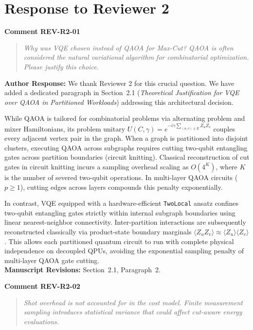 \documentclass[11pt,a4paper]{article}
\newcommand{\commentbox}[2]{
    \vspace{0.8em}
    \noindent\textbf{\textcolor{commentcolor}{#1}}
    \vspace{0.2em}
    \begin{quote}
        \small\itshape #2
    \end{quote}
}
\newcommand{\responsebox}[1]{
    \noindent\textbf{\textcolor{responsecolor}{Author Response:}} #1
    \vspace{0.8em}
}
\begin{document}
\section*{Response to Reviewer 2}

\commentbox{Comment REV-R2-01}{Why was VQE chosen instead of QAOA for Max-Cut? QAOA is often considered the natural variational algorithm for combinatorial optimization. Please justify this choice.}

\responsebox{We thank Reviewer 2 for this crucial question. We have added a dedicated paragraph in Section~2.1 (\textit{Theoretical Justification for VQE over QAOA in Partitioned Workloads}) addressing this architectural decision.

While QAOA is tailored for combinatorial problems via alternating problem and mixer Hamiltonians, its problem unitary $U(C, \gamma) = e^{-i \gamma \sum_{(u,v) \in E} Z_u Z_v}$ couples every adjacent vertex pair in the graph. When a graph is partitioned into disjoint clusters, executing QAOA across subgraphs requires cutting two-qubit entangling gates across partition boundaries (circuit knitting). Classical reconstruction of cut gates in circuit knitting incurs a sampling overhead scaling as $O(4^K)$, where $K$ is the number of severed two-qubit operations. In multi-layer QAOA circuits ($p \ge 1$), cutting edges across layers compounds this penalty exponentially.

In contrast, VQE equipped with a hardware-efficient \texttt{TwoLocal} ansatz confines two-qubit entangling gates strictly within internal subgraph boundaries using linear nearest-neighbor connectivity. Inter-partition interactions are subsequently reconstructed classically via product-state boundary marginals $\langle Z_u Z_v \rangle \approx \langle Z_u \rangle \langle Z_v \rangle$. This allows each partitioned quantum circuit to run with complete physical independence on decoupled QPUs, avoiding the exponential sampling penalty of multi-layer QAOA gate cutting.
\\[0.3em]
\textbf{Manuscript Revisions:} Section~2.1, Paragraph~2.}

\commentbox{Comment REV-R2-02}{Shot overhead is not accounted for in the cost model. Finite measurement sampling introduces statistical variance that could affect cut-aware energy evaluations.}
\end{document}
